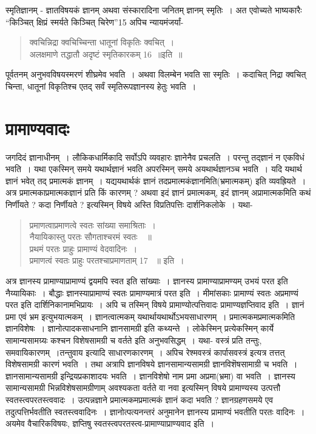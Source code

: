{स्मृतिज्ञानम् - ज्ञातविषयकं ज्ञानम् अथवा संस्कारादिना जनितम् ज्ञानम् स्मृतिः~। अत एवोच्यते भाष्यकारैः “किञ्चित् क्षिप्रं स्मर्यते किञ्चित् चिरेण”15 अपिच न्यायमंजर्यां-
\begin{verse}
क्वचिन्निद्रा क्वचिच्चिन्ता धातूनां विकृतिः क्वचित्~।\\
अलक्षमाणे तद्धातौ अदृष्टं स्मृतिकारकम् 16~॥इति~॥
\end{verse}
पूर्वतनम् अनुभवविषयस्मरणं शीघ्रमेव भवति~। अथवा विलम्बेन भवति सा स्मृतिः~। कदाचित् निद्रा क्वचित् चिन्ता, धातूनां विकृतिश्च एतद् सर्वं स्मृतिरूपज्ञानस्य हेतुः भवति~। 

\section*{प्रामाण्यवादः}

जगदिदं ज्ञानाधीनम्~। लौकिकधार्मिकादि सर्वोऽपि व्यवहारः ज्ञानेनैव प्रचलति~। परन्तु तद्ज्ञानं न एकविधं भवति~। यथा एकस्मिन् समये यथार्थज्ञानं भवति अपरस्मिन् समये अयथार्थज्ञानञ्च भवति~। यदि यथार्थ ज्ञानं भवेत् तद् प्रमात्मकं ज्ञानम्~। यद्ययथार्थकं ज्ञानं तदप्रमात्मकंज्ञानमिति(भ्रमात्मकम्) इति व्यवह्रियते~। अत्र प्रमात्मकाप्रमात्मकज्ञानं प्रति किं कारणम् ? अथवा इदं ज्ञानं प्रमात्मकम्, इदं ज्ञानम् अप्रामात्मकमिति कथं निर्णीयते ? कदा निर्णीयते ? इत्यस्मिन् विषये अस्ति विप्रतिपत्तिः दार्शनिकलोके~। यथा-
\begin{verse}
प्रमाणत्वाप्रमाणत्वे स्वतः सांख्या समाश्रिताः~।\\
नैयायिकास्तु परतः सौगताश्चरमं स्वतः~~॥\\
प्रथमं परतः प्राहुः प्रामाण्यं वेदवादिनः~।\\
प्रमाणत्वं स्वतः प्राहुः परतश्चाप्रमाणताम् 17 ~॥ इति~। 
\end{verse}
अत्र ज्ञानस्य प्रामाण्याप्रामाण्यं द्वयमपि स्वत इति सांख्याः~। ज्ञानस्य प्रामाण्याप्रामण्यम् \hbox{उभयं} परत इति नैय्यायिकाः~। बौद्धाः ज्ञानस्याप्रामाण्यं स्वतः प्रामाण्यमात्रं परत इति~। मीमांसकाः प्रामाण्यं स्वतः अप्रमाण्यं परत इति दार्शिनिकानामभिप्रायः~। अपि च तस्मिन् विषये प्रामाण्योत्पत्तिवादः प्रामाण्यज्ञप्तिवाद इति~। ज्ञानं प्रमा एवं भ्रम इत्युभयात्मकम्~। ज्ञानत्वात्मकम् यथार्थायथार्थोऽभयसाधारणम्~। प्रमात्मकमप्रमात्मकमिति ज्ञानविशेषः~। ज्ञानोत्पादकसाधनानि ज्ञानसामग्री इति कथ्यन्ते~। लोकेस्मिन् प्रत्येकस्मिन् कार्ये सामान्यसामग्र्यः कश्चन विशेषसामग्री च वर्तते इति अनुभवसिद्धम्~। यथा- वस्त्रं प्रति तन्तुः, समवायिकारणम्~।\hbox{तन्तुवाय} इत्यादि साधारणकारणम्~। अपिच रेश्मवस्त्रं कार्पासवस्त्रं इत्यत्र तत्तत् विशेषसामग्री कारणं भवति~। तथा अत्रापि ज्ञानविषये ज्ञानसामान्यसामग्री ज्ञानविशॆषसामाग्री च भवति~। ज्ञानसामान्यसामग्री इन्द्रियप्रकाशादयः भवति~। ज्ञानविशेषो नाम प्रमा अप्रमा(भ्रमा) वा भवति~। ज्ञानस्य सामान्यसामग्री भिन्नविशेषसामग्रीणाम् अवश्यकता वर्तते वा नवा इत्यस्मिन् विषये प्रामाण्यस्य उत्पत्तौ स्वतस्त्वपरतस्त्ववादः~। उत्पन्नज्ञाने प्रमात्मकमप्रमात्मकं ज्ञानं कदा भवति ? ज्ञानग्रहणसमये एव तदुत्पत्तिर्भवतीति स्वतस्त्ववादिनः~। ज्ञानोत्पत्यनन्तरं अनुमानेन ज्ञानस्य प्रामाण्यं भवतीति परतः वादिनः~। अयमेव वैचारिकविषयः, ज्ञप्तिषु स्वतस्त्वपरतस्त्व-प्रामाण्याप्राण्यवाद इति~। 
~\\[-1.5cm]
}
